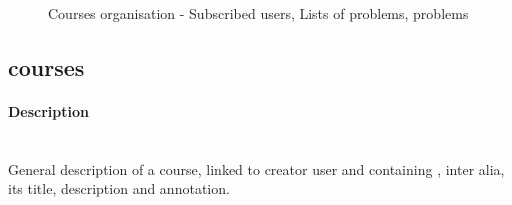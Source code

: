 \documentclass[../main.tex]{subfiles}
\begin{document}
\begin{figure}[h!]
\centering
{}
\caption[Courses organisation]{Courses organisation - Subscribed users, Lists of problems, problems }
\label{fig:courses_orga}
\end{figure}



\newpage
\subsection{courses} %
\begin{figure}
  \vspace{-20pt}
  \begin{center}
  \end{center}
  \vspace{-20pt}
\end{figure}

\paragraph{Description}~\\ %
General description of a course, linked to creator user and containing , inter alia, its title, description and annotation.
\end{document}
